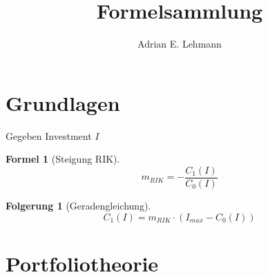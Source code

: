 
\usepackage[utf8]{inputenc}
\usepackage[T1]{fontenc}
\usepackage[light,condensed,math]{kurier}
\usepackage[ngerman]{babel}
\usepackage{hyperref}
\usepackage{amssymb}
\usepackage{mathtools}
\usepackage{etoolbox}

\usepackage{ntheorem}
\theoremstyle{break}
\newtheorem{formula}{Formel}[section]
\newtheorem{ann}{Bemerkung}[section]
\newtheorem{der}{Folgerung}[section]

\newcommand{\st}{\sum_{t=1}^{T}}

\title{Formelsammlung}
\author{Adrian E. Lehmann}


    \maketitle
    \tableofcontents
    \newpage
    \section{Grundlagen}
    Gegeben Investment $I$
    \begin{formula}[Steigung RIK]
        $$m_{RIK} = -\frac{C_1(I)}{C_0(I)}$$
    \end{formula}
    \begin{der}[Geradengleichung]
        $$C_1(I) = m_{RIK} \cdot (I_{max} - C_0(I))$$
    \end{der}
    \section{Portfoliotheorie}
